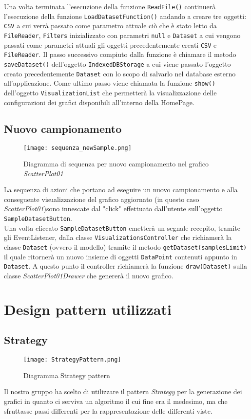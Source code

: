 Una volta terminata l'esecuzione della funzione \texttt{ReadFile()} continuerà l'esecuzione della funzione \texttt{LoadDatasetFunction()} andando a creare tre oggetti:
\texttt{CSV} a cui verrà passato come parametro attuale ciò che è stato letto da \texttt{FileReader}, \texttt{Filters} inizializzato con parametri \texttt{null} e \texttt{Dataset} a cui vengono passati come parametri attuali gli oggetti precedentemente creati \texttt{CSV} e \texttt{FileReader}.
Il passo successivo compiuto dalla funzione è chiamare il metodo \texttt{saveDataset()} dell'oggetto \texttt{IndexedDBStorage} a cui viene passato l'oggetto creato precedentemente \texttt{Dataset} con lo scopo di salvarlo nel database esterno all'applicazione.
Come ultimo passo viene chiamata la funzione \texttt{show()} dell'oggetto \texttt{VisualizationList} che permetterà la visualizzazione delle configurazioni dei grafici disponibili all'interno della HomePage.

\subsection{Nuovo campionamento}
\begin{figure}[H]
    \texttt{[image: sequenza\_newSample.png]}
    \caption{Diagramma di sequenza per nuovo campionamento nel grafico \textit{ScatterPlot01}}
\end{figure}
La sequenza di azioni che portano ad eseguire un nuovo campionamento e alla conseguente visualizzazione del grafico aggiornato (in questo caso \textit{ScatterPlot01})sono innescate dal "click" effettuato dall'utente sull'oggetto \texttt{SampleDatasetButton}.\\
Una volta cliccato \texttt{SampleDatasetButton} emetterà un segnale recepito, tramite gli EventListener, dalla classe \texttt{VisualizationsController} che richiamerà la classe \texttt{Dataset} (ovvero il modello) tramite il metodo \texttt{getDataset(samplesLimit)} il quale ritornerà un nuovo insieme di oggetti \texttt{DataPoint} contenuti appunto in \texttt{Dataset}. A questo punto il controller richiamerà la funzione \texttt{draw(Dataset)} sulla classe \textit{ScatterPlot01Drawer} che genererà il nuovo grafico.


\section{Design pattern utilizzati}
\subsection{Strategy}
\begin{figure}[H]
	\centering
	\texttt{[image: StrategyPattern.png]}
	\caption{Diagramma Strategy pattern}
  \end{figure}
Il nostro gruppo ha scelto di utilizzare il pattern \textit{Strategy} per la generazione dei grafici in quanto ci serviva un algoritmo il cui fine era il medesimo, ma che sfruttasse passi differenti per la rappresentazione delle differenti viste.

